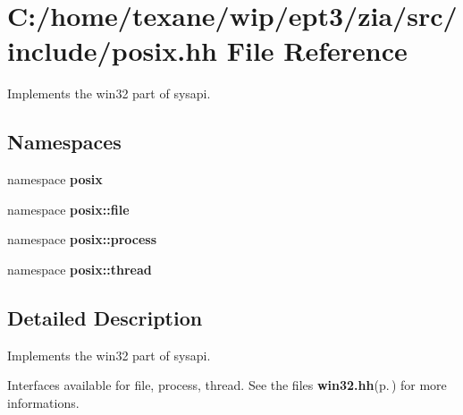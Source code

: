 \section{C:/home/texane/wip/ept3/zia/src/include/posix.hh File Reference}
\label{posix_8hh}
Implements the win32 part of sysapi. 

\subsection*{Namespaces}
\begin{CompactItemize}
\item 
namespace {\bf posix}
\item 
namespace {\bf posix::file}
\item 
namespace {\bf posix::process}
\item 
namespace {\bf posix::thread}
\end{CompactItemize}


\subsection{Detailed Description}
Implements the win32 part of sysapi. 

Interfaces available for file, process, thread. See the files {\bf win32.hh}{\rm (p.\,\pageref{win32_8hh})} for more informations. 
